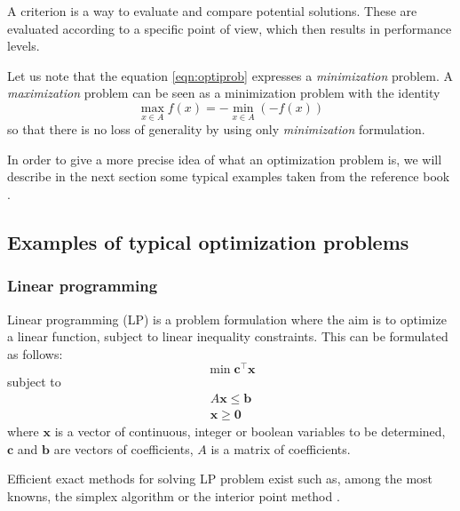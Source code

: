 \begin{definition}[Criterion]
A criterion is a way to evaluate and compare potential solutions. These are evaluated according to a specific point of view, which then results in performance levels.
\end{definition}

Let us note that the equation \ref{eqn:optiprob} expresses a \emph{minimization} problem. A \emph{maximization} problem can be seen as a minimization problem with the identity
\begin{equation}
\max_{x \in A} f(x) = - \min_{x \in A} (-f(x))
\end{equation}
so that there is no loss of generality by using only \emph{minimization} formulation.

In order to give a more precise idea of what an optimization problem is, we will describe in the next section some typical examples taken from the reference book \cite{talbi09, BraMar2002}.

\subsection{Examples of typical optimization problems}
\subsubsection{Linear programming}
Linear programming (LP) is a problem formulation where the aim is to optimize a linear function, subject to linear inequality constraints. This can be formulated as follows:
\begin{equation}
\min \mathbf{c}^\intercal\mathbf{x}
\end{equation}
subject to
\begin{equation*}
\begin{gathered}
A\mathbf{x} \leq \mathbf{b}\\
\mathbf{x} \geq \mathbf{0}
\end{gathered}
\end{equation*}
where $\mathbf{x}$ is a vector of continuous, integer or boolean variables to be determined, $\mathbf{c}$ and $\mathbf{b}$ are vectors of coefficients, $A$ is a matrix of coefficients.

Efficient exact methods for solving LP problem exist such as, among the most knowns, the simplex algorithm \cite{dantzig51} or the interior point method \cite{Karmarkar84}.

